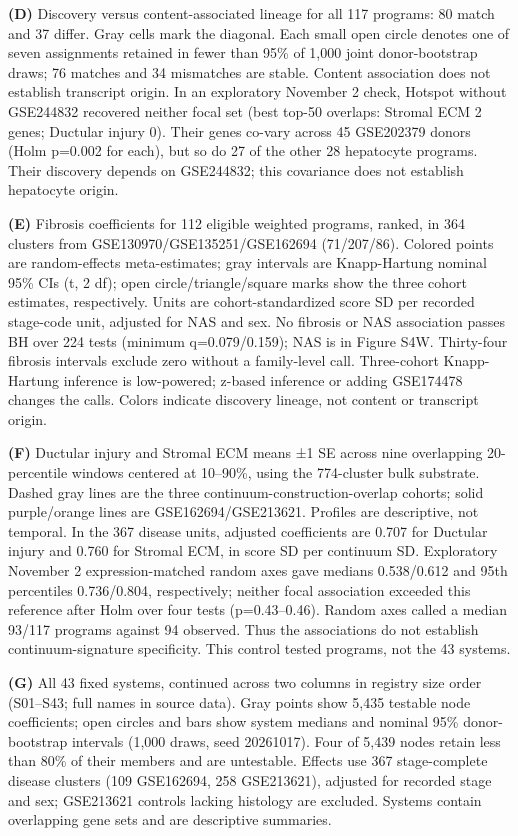 \textbf{(D)} Discovery versus content-associated lineage for all 117 programs: 80 match and 37 differ. Gray cells mark the diagonal. Each small open circle denotes one of seven assignments retained in fewer than 95\% of 1,000 joint donor-bootstrap draws; 76 matches and 34 mismatches are stable. Content association does not establish transcript origin. In an exploratory November 2 check, Hotspot without GSE244832 recovered neither focal set (best top-50 overlaps: Stromal ECM 2 genes; Ductular injury 0). Their genes co-vary across 45 GSE202379 donors (Holm p=0.002 for each), but so do 27 of the other 28 hepatocyte programs. Their discovery depends on GSE244832; this covariance does not establish hepatocyte origin.

\textbf{(E)} Fibrosis coefficients for 112 eligible weighted programs, ranked, in 364 clusters from GSE130970/GSE135251/GSE162694 (71/207/86). Colored points are random-effects meta-estimates; gray intervals are Knapp-Hartung nominal 95\% CIs (t, 2 df); open circle/triangle/square marks show the three cohort estimates, respectively. Units are cohort-standardized score SD per recorded stage-code unit, adjusted for NAS and sex. No fibrosis or NAS association passes BH over 224 tests (minimum q=0.079/0.159); NAS is in Figure S4W. Thirty-four fibrosis intervals exclude zero without a family-level call. Three-cohort Knapp-Hartung inference is low-powered; z-based inference or adding GSE174478 changes the calls. Colors indicate discovery lineage, not content or transcript origin.

\textbf{(F)} Ductular injury and Stromal ECM means ±1 SE across nine overlapping 20-percentile windows centered at 10--90\%, using the 774-cluster bulk substrate. Dashed gray lines are the three continuum-construction-overlap cohorts; solid purple/orange lines are GSE162694/GSE213621. Profiles are descriptive, not temporal. In the 367 disease units, adjusted coefficients are 0.707 for Ductular injury and 0.760 for Stromal ECM, in score SD per continuum SD. Exploratory November 2 expression-matched random axes gave medians 0.538/0.612 and 95th percentiles 0.736/0.804, respectively; neither focal association exceeded this reference after Holm over four tests (p=0.43--0.46). Random axes called a median 93/117 programs against 94 observed. Thus the associations do not establish continuum-signature specificity. This control tested programs, not the 43 systems.

\textbf{(G)} All 43 fixed systems, continued across two columns in registry size order (S01--S43; full names in source data). Gray points show 5,435 testable node coefficients; open circles and bars show system medians and nominal 95\% donor-bootstrap intervals (1,000 draws, seed 20261017). Four of 5,439 nodes retain less than 80\% of their members and are untestable. Effects use 367 stage-complete disease clusters (109 GSE162694, 258 GSE213621), adjusted for recorded stage and sex; GSE213621 controls lacking histology are excluded. Systems contain overlapping gene sets and are descriptive summaries.

